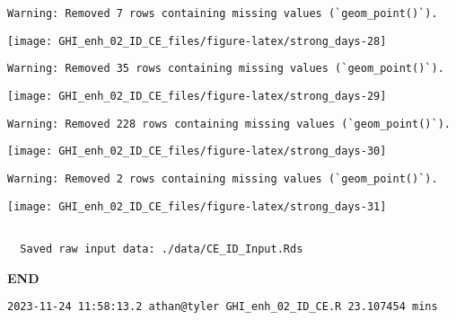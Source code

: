 \documentclass[
  10pt,
  a4paper,oneside]{article}
\begin{document}
\begin{verbatim}
Warning: Removed 7 rows containing missing values (`geom_point()`).
\end{verbatim}

\begin{center}\texttt{[image: GHI\_enh\_02\_ID\_CE\_files/figure-latex/strong\_days-28]} \end{center}

\begin{verbatim}
Warning: Removed 35 rows containing missing values (`geom_point()`).
\end{verbatim}

\begin{center}\texttt{[image: GHI\_enh\_02\_ID\_CE\_files/figure-latex/strong\_days-29]} \end{center}

\begin{verbatim}
Warning: Removed 228 rows containing missing values (`geom_point()`).
\end{verbatim}

\begin{center}\texttt{[image: GHI\_enh\_02\_ID\_CE\_files/figure-latex/strong\_days-30]} \end{center}

\begin{verbatim}
Warning: Removed 2 rows containing missing values (`geom_point()`).
\end{verbatim}

\begin{center}\texttt{[image: GHI\_enh\_02\_ID\_CE\_files/figure-latex/strong\_days-31]} \end{center}

\begin{verbatim}

  Saved raw input data: ./data/CE_ID_Input.Rds 
\end{verbatim}

\textbf{END}

\begin{verbatim}
2023-11-24 11:58:13.2 athan@tyler GHI_enh_02_ID_CE.R 23.107454 mins
\end{verbatim}
\end{document}
